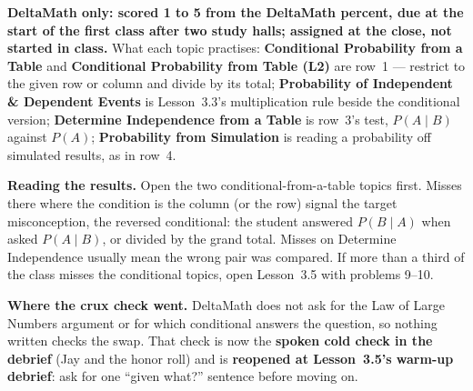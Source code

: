 \documentclass[10pt]{article}
\begin{document}
\begin{teachernote}[Homework]
\textbf{DeltaMath only: scored 1 to 5 from the DeltaMath percent, due at the start of the first
class after two study halls; assigned at the close, not started in class.} What each topic
practises: \textbf{Conditional Probability from a Table} and \textbf{Conditional Probability from
Table (L2)} are row~1 --- restrict to the given row or column and divide by its total;
\textbf{Probability of Independent \& Dependent Events} is Lesson~3.3's multiplication rule beside
the conditional version; \textbf{Determine Independence from a Table} is row~3's test, $P(A \mid B)$
against $P(A)$; \textbf{Probability from Simulation} is reading a probability off simulated results,
as in row~4.

\textbf{Reading the results.} Open the two conditional-from-a-table topics first. Misses there where
the condition is the column (or the row) signal the target misconception, the reversed conditional:
the student answered $P(B \mid A)$ when asked $P(A \mid B)$, or divided by the grand total. Misses
on Determine Independence usually mean the wrong pair was compared. If more than a third of the
class misses the conditional topics, open Lesson~3.5 with problems 9--10.

\textbf{Where the crux check went.} DeltaMath does not ask for the Law of Large Numbers argument or
for which conditional answers the question, so nothing written checks the swap. That check is now
the \textbf{spoken cold check in the debrief} (Jay and the honor roll) and is \textbf{reopened at
Lesson~3.5's warm-up debrief}: ask for one ``given what?'' sentence before moving on.
\end{teachernote}
\end{document}
